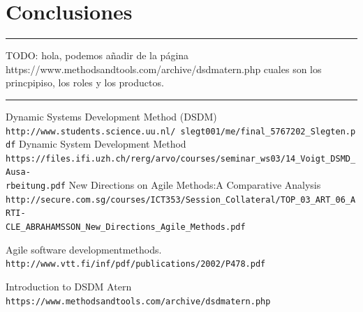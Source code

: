 \documentclass[12pt,a4paper]{article}
\begin{document}
\section{Conclusiones}

{\color{red} \rule{\linewidth}{0.5mm} }
{\color{blue} TODO: hola, podemos añadir de la página https://www.methodsandtools.com/archive/dsdmatern.php cuales son los princpipiso, los roles y los productos.}\\
{\color{red} \rule{\linewidth}{0.5mm} }

\begin{thebibliography}{9}

 Dynamic Systems Development Method (DSDM)
\\\texttt{http://www.students.science.uu.nl/~slegt001/me/final\_5767202\_Slegten.pdf}
Dynamic System Development Method
\\\texttt{https://files.ifi.uzh.ch/rerg/arvo/courses/seminar\_ws03/14\_Voigt\_DSMD\_Ausa-\\rbeitung.pdf}
New Directions on Agile Methods:A Comparative Analysis
\\\texttt{http://secure.com.sg/courses/ICT353/Session\_Collateral/TOP\_03\_ART\_06\_ARTI-\\CLE\_ABRAHAMSSON\_New\_Directions\_Agile\_Methods.pdf}

Agile software developmentmethods.
\\\texttt{http://www.vtt.fi/inf/pdf/publications/2002/P478.pdf}


Introduction to DSDM Atern
\\\texttt{https://www.methodsandtools.com/archive/dsdmatern.php}
\end{thebibliography}
\end{document}
